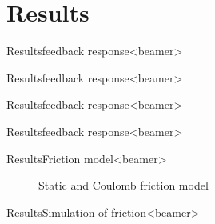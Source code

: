 \section{Results}
\begin{frame}{Results}{feedback response}<beamer>
\vspace*{1.5cm}
\begin{figure}
\centering

\end{figure}
\end{frame}

\begin{frame}{Results}{feedback response}<beamer>
\vspace*{1.5cm}
\begin{figure}
\centering

\end{figure}
\end{frame}

\begin{frame}{Results}{feedback response}<beamer>
\vspace*{1.5cm}
\begin{figure}
\centering

\end{figure}
\end{frame}

\begin{frame}{Results}{feedback response}<beamer>
\vspace*{1.5cm}
\begin{figure}
\centering

\end{figure}
\end{frame}

\begin{frame}{Results}{Friction model}<beamer>
\vspace*{1.5cm}
\begin{figure}[h]
\centering
\caption{Static and Coulomb friction model}
\label{fig:new_friction_model}
\end{figure}
\end{frame}


\begin{frame}{Results}{Simulation of friction}<beamer>
\vspace*{1.5cm}
\begin{figure}
\centering

\end{figure}
\end{frame}
